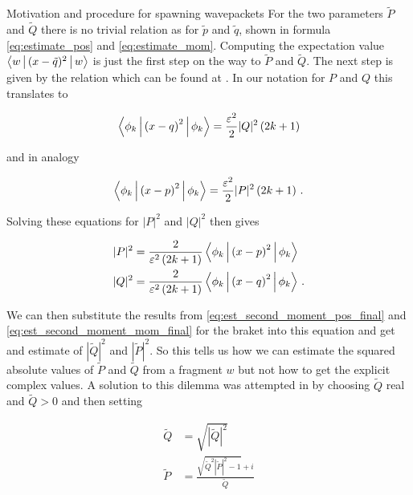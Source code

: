 \begin{chapter}{Motivation and procedure for spawning wavepackets}
For the two parameters $\tilde{P}$ and $\tilde{Q}$ there is no trivial relation
as for $\tilde{p}$ and $\tilde{q}$, shown in formula \eqref{eq:estimate_pos} and \eqref{eq:estimate_mom}.
Computing the expectation value $\Braket{w|(x-\tilde{q})^2|w}$ is just the first
step on the way to $\tilde{P}$ and $\tilde{Q}$. The next step is given by the
relation which can be found at \cite[formula 2.24]{H_ladder_operators}. In our
notation for $P$ and $Q$ this translates to

\begin{equation}
  \Braket{\phi_k | \left(x-q\right)^2 | \phi_k} = \frac{\varepsilon^2}{2} |Q|^2 \left(2k + 1\right)
\end{equation}

and in analogy

\begin{equation}
  \Braket{\phi_k | \left(x-p\right)^2 | \phi_k} = \frac{\varepsilon^2}{2} |P|^2 \left(2k + 1\right) \,.
\end{equation}

Solving these equations for $|P|^2$ and $|Q|^2$ then gives

\begin{equation}
\label{eq:estimate_abssqrPQ}
\begin{split}
  |P|^2 & = \frac{2}{\varepsilon^2 \left(2k + 1\right)} \Braket{\phi_k | \left(x-p\right)^2 | \phi_k} \\
  |Q|^2 & = \frac{2}{\varepsilon^2 \left(2k + 1\right)} \Braket{\phi_k | \left(x-q\right)^2 | \phi_k} \,.
\end{split}
\end{equation}

We can then substitute the results from \eqref{eq:est_second_moment_pos_final} and
\eqref{eq:est_second_moment_mom_final} for the braket into this equation and get
and estimate of $|\tilde{Q}|^2$ and $|\tilde{P}|^2$. So this tells us how we
can estimate the squared absolute values of $\tilde{P}$ and $\tilde{Q}$ from
a fragment $w$ but not how to get the explicit complex values. A solution to this
dilemma was attempted in \cite[formula 16 and 17]{GHJ_tunneling_spawning} by
choosing $\tilde{Q}$ real and $\tilde{Q} > 0$ and then setting

\begin{equation}
\begin{split}
  \tilde{Q} & = \sqrt{|\tilde{Q}|^2} \\
  \tilde{P} & = \frac{\sqrt{\tilde{Q}^2 |\tilde{P}|^2-1}+i}{\tilde{Q}}
\end{split}
\end{equation}


\end{chapter}
